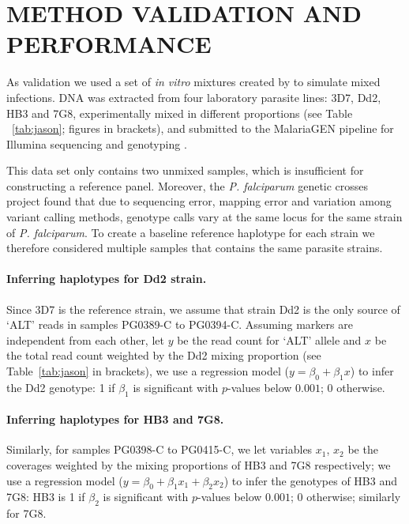 \documentclass{nature}
\begin{document}
\section*{METHOD VALIDATION AND PERFORMANCE}

As validation we used a set of {\it in vitro} mixtures created by \cite{Wendler2015} to simulate mixed infections. DNA was extracted from four laboratory parasite lines: 3D7, Dd2, HB3 and 7G8, experimentally mixed in different proportions (see Table ~\ref{tab:jason}; figures in brackets), and submitted to the MalariaGEN pipeline \cite{MalariaGen2008} for Illumina sequencing and genotyping \cite{Menske2012}.

This data set only contains two unmixed samples, which is insufficient for constructing a reference panel. Moreover, the {\em P. falciparum} genetic crosses project \cite{Miles2016} found that due to sequencing error, mapping error and variation among variant calling methods, genotype calls vary at the same locus for the same strain of {\it P. falciparum}. To create a baseline reference haplotype for each strain we therefore considered multiple samples that contains the same parasite strains.

\paragraph{Inferring haplotypes for Dd2 strain.}
Since 3D7 is the reference strain, we assume that strain Dd2 is the only source of `ALT' reads in samples {\textmd PG0389-C} to {\textmd PG0394-C}. Assuming markers are independent from each other, let $y$ be the read count for `ALT' allele and $x$ be the total read count weighted by the Dd2 mixing proportion (see Table~\ref{tab:jason} in brackets), we use a regression model ($y = \beta_0 + \beta_{1} x$) to infer the Dd2 genotype: 1 if $\beta_{1}$ is significant with $p$-values below $0.001$; 0 otherwise.

\paragraph{Inferring haplotypes for HB3 and 7G8.}
Similarly, for samples {\textmd PG0398-C} to {\textmd PG0415-C}, we let variables $x_1$, $x_2$ be the coverages weighted by the mixing proportions of HB3 and 7G8 respectively; we use a regression model ($y = \beta_0 + \beta_{1} x_1 + \beta_{2} x_2$) to infer the genotypes of HB3 and 7G8: HB3 is 1 if $\beta_{2}$ is significant with $p$-values below $0.001$; 0 otherwise; similarly for 7G8.
\end{document}
